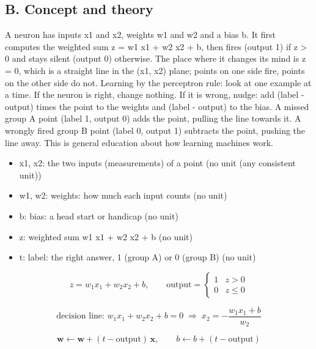 \documentclass[11pt,a4paper]{article}
\begin{document}
\subsection*{B. Concept and theory}
A neuron has inputs x1 and x2, weights w1 and w2 and a bias b. It first computes the weighted sum z = w1 x1 + w2 x2 + b, then fires (output 1) if z \textgreater{} 0 and stays silent (output 0) otherwise. The place where it changes its mind is z = 0, which is a straight line in the (x1, x2) plane; points on one side fire, points on the other side do not. Learning by the perceptron rule: look at one example at a time. If the neuron is right, change nothing. If it is wrong, nudge: add (label - output) times the point to the weights and (label - output) to the bias. A missed group A point (label 1, output 0) adds the point, pulling the line towards it. A wrongly fired group B point (label 0, output 1) subtracts the point, pushing the line away. This is general education about how learning machines work.

\begin{itemize}[nosep]
\item x1, x2: the two inputs (measurements) of a point (no unit (any consistent unit))
\item w1, w2: weights: how much each input counts (no unit)
\item b: bias: a head start or handicap (no unit)
\item z: weighted sum w1 x1 + w2 x2 + b (no unit)
\item t: label: the right answer, 1 (group A) or 0 (group B) (no unit)
\end{itemize}

\begin{equation*}
z = w_1 x_1 + w_2 x_2 + b,\qquad \text{output} = \begin{cases}1 & z > 0\\ 0 & z \le 0\end{cases}
\end{equation*}

\begin{equation*}
\text{decision line: } w_1 x_1 + w_2 x_2 + b = 0 \;\Rightarrow\; x_2 = -\frac{w_1 x_1 + b}{w_2}
\end{equation*}

\begin{equation*}
\mathbf w \leftarrow \mathbf w + (t - \text{output})\,\mathbf x,\qquad b \leftarrow b + (t - \text{output})
\end{equation*}
\end{document}
